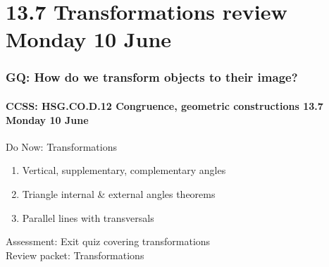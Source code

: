\documentclass{beamer}
\begin{document}
  \section{13.7 Transformations review Monday 10 June}
    \frame
    {
      \frametitle{GQ: How do we transform objects to their image?}
      \framesubtitle{CCSS: HSG.CO.D.12 Congruence, geometric constructions \hfill \alert{13.7 Monday 10 June}}

      \begin{block}{Do Now: Transformations}
        \begin{enumerate}
          \item Vertical, supplementary, complementary angles
          \item Triangle internal \& external angles theorems
          \item Parallel lines with transversals
        \end{enumerate}
      \end{block}
      Assessment: Exit quiz covering transformations\\
      Review packet: Transformations
    }
\end{document}
